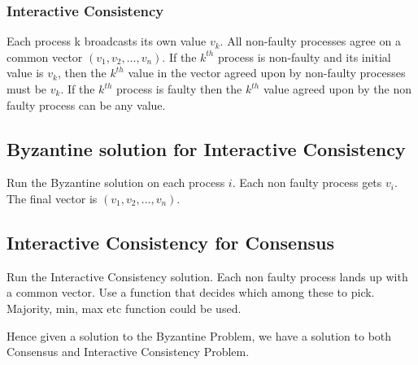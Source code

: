 \documentclass[twoside]{article}
\begin{document}
\subsubsection{Interactive Consistency}
Each process k broadcasts its own value $v_{k}$. All non-faulty processes agree on a common vector $(v_1, v_2, \dots, v_n)$. If the $k^{th}$ process is non-faulty and its initial value is $v_k$, then the $k^{th}$ value in the vector agreed upon by non-faulty processes must be $v_k$. If the $k^{th}$ process is faulty then the $k^{th}$ value agreed upon by the non faulty process can be any value.

\subsection{Byzantine solution for Interactive Consistency}
Run the Byzantine solution on each process $i$. Each non faulty process gets $v_i$. The final vector is $(v_1, v_2, \dots, v_n)$.

\subsection{Interactive Consistency for Consensus}
Run the Interactive Consistency solution. Each non faulty process lands up with a common vector. Use a function that decides which among these to pick. Majority, min, max etc function could be used.


Hence given a solution to the Byzantine Problem, we have a solution to both Consensus and Interactive Consistency Problem.
\end{document}
